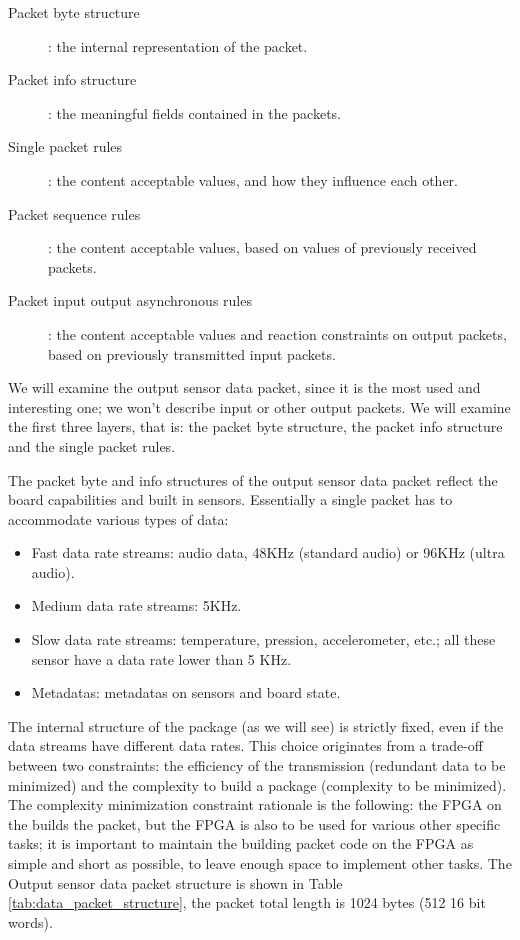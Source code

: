 \documentclass{article} \usepackage{times}
\begin{document}
\begin{description}
\item[Packet byte structure]: the internal representation of the
  packet.
\item[Packet info structure]: the meaningful fields contained in the
  packets.
\item[Single packet rules]: the content acceptable values, and how
  they influence each other.
\item[Packet sequence rules]: the content acceptable values, based on
  values of previously received packets.
\item[Packet input output asynchronous rules]: the content acceptable
  values and reaction constraints on output packets, based on
  previously transmitted input packets.
\end{description}

We will examine the output sensor data packet, since it is the most
used and interesting one; we won't describe input or other output
packets.  We will examine the first three layers, that is: the packet
byte structure, the packet info structure and the single packet rules.

The packet byte and info structures of the output sensor data packet
reflect the board capabilities and built in sensors.  Essentially a
single packet has to accommodate various types of data:

\begin{itemize}
\item Fast data rate streams: audio data, 48KHz (standard audio) or
  96KHz (ultra audio).
\item Medium data rate streams: 5KHz.
\item Slow data rate streams: temperature, pression, accelerometer,
  etc.; all these sensor have a data rate lower than 5 KHz.
\item Metadatas: metadatas on sensors and board state.
\end{itemize}

The internal structure of the package (as we will see) is strictly
fixed, even if the data streams have different data rates.  This
choice originates from a trade-off between two constraints: the
efficiency of the transmission (redundant data to be minimized) and
the complexity to build a package (complexity to be minimized).  The
complexity minimization constraint rationale is the following: the
FPGA on the \STSB builds the packet, but the FPGA is also to be used
for various other specific tasks; it is important to maintain the
building packet code on the FPGA as simple and short as possible, to
leave enough space to implement other tasks.  The Output sensor data
packet structure is shown in Table \ref{tab:data_packet_structure},
the packet total length is 1024 bytes (512 16 bit words).
\end{document}
